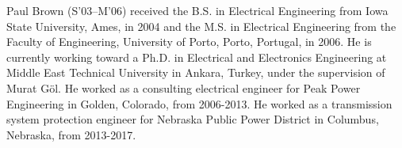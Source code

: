 \documentclass[conference,a4paper]{IEEEtran}[2015/08/26]
\begin{document}
\begin{IEEEbiography}{Paul Brown}
	(S’03–M’06)
	received the B.S. in Electrical Engineering from Iowa State University, Ames, in 2004
	and the M.S. in Electrical Engineering from the Faculty of Engineering, University of Porto, Porto, Portugal, in 2006.
	He is currently working toward a Ph.D. in Electrical and Electronics Engineering at Middle East Technical University in Ankara, Turkey, under the supervision of Murat Göl.
	He worked as a consulting electrical engineer for Peak Power Engineering in Golden, Colorado, from 2006-2013.
	He worked as a transmission system protection engineer for Nebraska Public Power District in Columbus, Nebraska, from 2013-2017.
\end{IEEEbiography}
\end{document}
